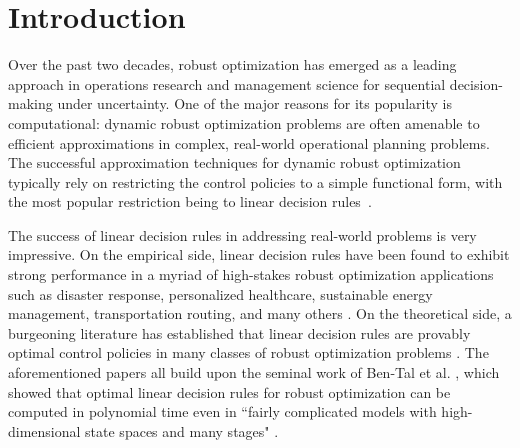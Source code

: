 \documentclass[nonblindrev,mnsc]{informs3} %
\begin{document}



\maketitle


\section{Introduction} \label{sec:intro}
Over the past two decades, {robust optimization} has emerged as a leading approach in operations research and management science for sequential decision-making  under uncertainty. 
One of the major reasons for its popularity is {computational}: dynamic robust optimization problems 
are often amenable to efficient approximations in complex, real-world operational planning problems.  The successful approximation techniques  for dynamic robust optimization typically rely on restricting the control policies to a simple functional form, with the most popular restriction being to {linear decision rules}~\cite{ben2004adjustable}. 


 The success of linear decision rules in addressing real-world problems is  very impressive. On the empirical side, 
linear decision rules have been found to exhibit strong performance in a myriad of high-stakes robust optimization applications such as disaster response,  personalized healthcare, sustainable energy management, transportation routing, and many others \citep{simchi2019designing,lia2022distributional,eikelder2019adjustable,sani2020affine,gauvin2017decision}.  
On the theoretical side, a burgeoning literature has established that linear decision rules are provably optimal control policies in many classes of robust optimization problems  \citep{bertsimas2012power,bertsimas2010optimality,iancu2013supermodularity,gounaris2013robust,ardestani2016robust,simchi2019designing,el2021optimality,georghiou2021optimality,zhen2018adjustable}. 
 The aforementioned papers all build upon the seminal work of Ben-Tal et al. \cite{ben2004adjustable}, which showed that optimal linear decision rules for  robust optimization can be computed in polynomial time even in ``{fairly complicated models with high-dimensional state spaces and many stages}"  \citep[p. 374]{ben2004adjustable}.
 
\end{document}
